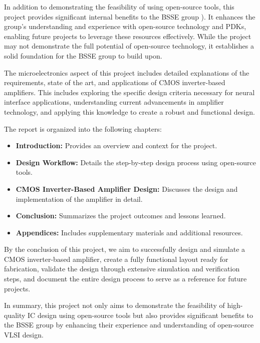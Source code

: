 In addition to demonstrating the feasibility of using open-source tools, this project provides significant internal benefits to the BSSE group \parencite{Department_of_Biosystems_Science_and_Engineering_2024}). It enhances the group's understanding and experience with open-source technology and PDKs, enabling future projects to leverage these resources effectively. While the project may not demonstrate the full potential of open-source technology, it establishes a solid foundation for the BSSE group to build upon.

The microelectronics aspect of this project includes detailed explanations of the requirements, state of the art, and applications of CMOS inverter-based amplifiers. This includes exploring the specific design criteria necessary for neural interface applications, understanding current advancements in amplifier technology, and applying this knowledge to create a robust and functional design.

The report is organized into the following chapters:
\begin{itemize}
\item \textbf{Introduction:} Provides an overview and context for the project.
\item \textbf{Design Workflow:} Details the step-by-step design process using open-source tools.
\item \textbf{CMOS Inverter-Based Amplifier Design:} Discusses the design and implementation of the amplifier in detail.
\item \textbf{Conclusion:} Summarizes the project outcomes and lessons learned.
\item \textbf{Appendices:} Includes supplementary materials and additional resources.
\end{itemize}

By the conclusion of this project, we aim to successfully design and simulate a CMOS inverter-based amplifier, create a fully functional layout ready for fabrication, validate the design through extensive simulation and verification steps, and document the entire design process to serve as a reference for future projects.

In summary, this project not only aims to demonstrate the feasibility of high-quality IC design using open-source tools but also provides significant benefits to the BSSE group by enhancing their experience and understanding of open-source VLSI design.